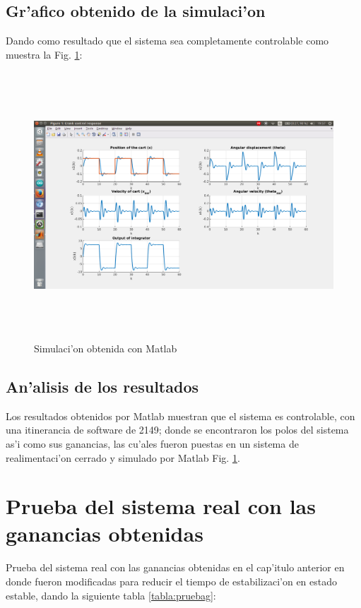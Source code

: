 \subsection{Gr'afico obtenido de la simulaci'on}
Dando como resultado que el sistema sea completamente controlable como muestra la Fig. \ref{fig:simu}:

\begin{center}
\begin{figure}[ht]
	\centering
		\includegraphics[width=15cm, height=10cm]{simu}
	\caption{Simulaci'on obtenida con Matlab}
	\label{fig:simu}
\end{figure}
\end{center}
\subsection{An'alisis de los resultados}
Los resultados obtenidos por Matlab muestran que el sistema es controlable, con una itinerancia de software de 2149; donde se encontraron los polos del sistema as'i como sus ganancias, las cu'ales fueron puestas en un sistema de realimentaci'on cerrado y simulado por Matlab Fig. \ref{fig:simu}.


\section{Prueba del sistema real con las ganancias obtenidas}
Prueba del sistema real con las ganancias obtenidas en el cap'itulo anterior en donde fueron modificadas para reducir el tiempo de estabilizaci'on en estado estable, dando la siguiente tabla \ref{tabla:pruebag}:

